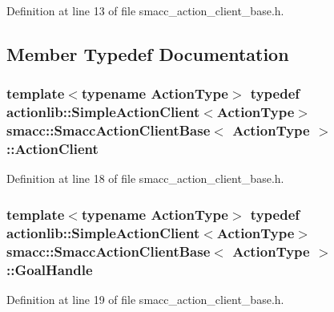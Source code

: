 Definition at line 13 of file smacc\+\_\+action\+\_\+client\+\_\+base.\+h.



\subsection{Member Typedef Documentation}
\subsubsection[{\texorpdfstring{Action\+Client}{ActionClient}}]{\setlength{\rightskip}{0pt plus 5cm}template$<$typename Action\+Type$>$ typedef actionlib\+::\+Simple\+Action\+Client$<$Action\+Type$>$ {\bf smacc\+::\+Smacc\+Action\+Client\+Base}$<$ Action\+Type $>$\+::{\bf Action\+Client}}\hypertarget{classsmacc_1_1SmaccActionClientBase_aea1392d9e41f48bda1de8acaec1c3233}{}\label{classsmacc_1_1SmaccActionClientBase_aea1392d9e41f48bda1de8acaec1c3233}


Definition at line 18 of file smacc\+\_\+action\+\_\+client\+\_\+base.\+h.

\subsubsection[{\texorpdfstring{Goal\+Handle}{GoalHandle}}]{\setlength{\rightskip}{0pt plus 5cm}template$<$typename Action\+Type$>$ typedef actionlib\+::\+Simple\+Action\+Client$<$Action\+Type$>$ {\bf smacc\+::\+Smacc\+Action\+Client\+Base}$<$ Action\+Type $>$\+::{\bf Goal\+Handle}}\hypertarget{classsmacc_1_1SmaccActionClientBase_a70384df77a0bbf416475e730960a77cf}{}\label{classsmacc_1_1SmaccActionClientBase_a70384df77a0bbf416475e730960a77cf}


Definition at line 19 of file smacc\+\_\+action\+\_\+client\+\_\+base.\+h.

